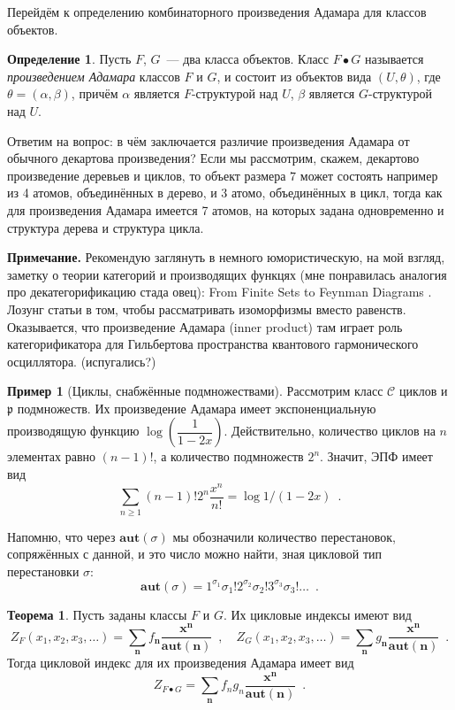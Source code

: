 \documentclass[a5paper]{article}
\def \vec {\boldsymbol}
\theoremstyle{definition}
\newtheorem{example}{Пример}
\newtheorem*{theorem}{Теорема}
\newtheorem*{definition}{Определение}
\begin{document}
Перейдём к определению комбинаторного произведения Адамара для классов объектов.
\begin{definition}
    Пусть \( F \), \( G\)~--- два класса объектов. Класс \( F \bullet G \)
называется \textit{произведением Адамара} классов \( F \) и \( G \), и состоит
из объектов вида \( (U, \theta) \), где \( \theta = (\alpha, \beta) \), причём
\(\alpha \) является \(F\)-структурой над \(U \), \(\beta\) является
\(G\)-структурой над \( U \).
\end{definition}
Ответим на вопрос: в чём заключается различие произведения Адамара от обычного
декартова произведения? Если мы рассмотрим, скажем, декартово произведение
деревьев и циклов, то объект размера \( 7 \) может состоять например из 4
атомов, объединённых в дерево, и 3 атомо, объединённых в цикл, тогда как для
произведения Адамара имеется 7 атомов, на которых задана одновременно и
структура дерева и структура цикла.

{\footnotesize
\textbf{Примечание.} Рекомендую заглянуть в немного юмористическую, на мой
взгляд, заметку о теории категорий и производящих функцях
(мне понравилась аналогия про декатегорификацию стада овец): From Finite Sets to Feynman Diagrams
\cite{category_feynman}. Лозунг статьи в том, чтобы рассматривать изоморфизмы
вместо равенств. Оказывается, что произведение Адамара (inner product)
там играет роль категорификатора для Гильбертова пространства квантового
гармонического осциллятора. (испугались?)
}

\begin{example}[Циклы, снабжённые подмножествами]
Рассмотрим класс \( \mathcal C \) циклов и \( \mathfrak p \) подмножеств. Их
произведение Адамара имеет экспоненциальную производящую функцию  \( \log \left(
\dfrac{1}{1 - 2x} \right) \). Действительно, количество циклов на \( n \)
элементах равно \( (n-1)! \), а количество подмножеств \( 2^n \). Значит, ЭПФ
имеет вид
\[
    \sum_{n \geq 1} (n-1)! 2^n\dfrac{x^n}{n!} = \log 1/(1-2x) \enspace .
\]
\end{example}

Напомню, что через \( \mathbf{aut}(\sigma) \) мы обозначили количество
перестановок, сопряжённых с данной, и это число можно найти, зная цикловой тип
перестановки \( \sigma \):
\[
    \mathbf{aut}(\sigma) = 1^{\sigma_1} \sigma_1! 2^{\sigma_2} \sigma_2!
3^{\sigma_3} \sigma_3 ! \ldots \enspace .
\]

\begin{theorem}
    Пусть заданы классы \( F \) и \( G \). Их цикловые индексы имеют вид
\[
    Z_F(x_1, x_2, x_3, \ldots) = \sum_{\vec n} f_{\vec n} \dfrac{\vec x^{\vec
n}}{\mathbf{aut}(\vec n)} \enspace , \quad
    Z_G(x_1, x_2, x_3, \ldots) = \sum_{\vec n} g_{\vec n} \dfrac{\vec x^{\vec
n}}{\mathbf{aut}(\vec n)} \enspace .
\]
Тогда цикловой индекс для их произведения
Адамара имеет вид
\[
    Z_{F \bullet G} = \sum_{\vec n} f_n g_n \dfrac{\vec x^{\vec
n}}{\mathbf{aut}(\vec n)} \enspace . 
\] 
\end{theorem}
\end{document}
